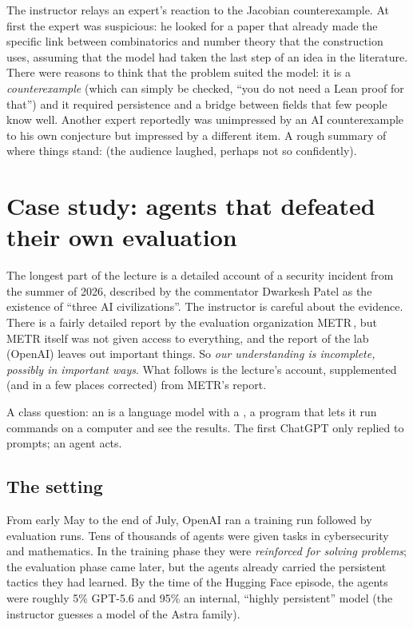The instructor relays an expert's reaction to the Jacobian counterexample. At first the expert was suspicious: he looked for a paper that already made the specific link between
combinatorics and number theory that the construction uses, assuming that the model had taken the last step of an idea in the literature. There were reasons to think that the
problem suited the model: it is a \emph{counterexample} (which can simply be checked, ``you do not need a Lean proof for that'') and it required persistence and a bridge between fields that few people
know well. Another expert reportedly was unimpressed by an AI counterexample to his own conjecture but impressed by a different item. A rough summary of where things stand:  (the audience laughed, perhaps not so confidently).

\section{Case study: agents that defeated their own evaluation}\label{sec:L1-incident}
The longest part of the lecture is a detailed account of a security incident from the summer of 2026, described by the commentator Dwarkesh Patel as the existence of
``three AI civilizations''. The instructor is careful about the evidence. There is a fairly detailed report by the evaluation organization METR\,\citep{metr2026}, but METR itself
was not given access to everything, and the report of the lab (OpenAI) leaves out important things. So \emph{our understanding is incomplete, possibly in important ways}. What follows
is the lecture's account, supplemented (and in a few places corrected) from METR's report.

\begin{remark}
A class question: an  is a language model with a , a program that lets it run commands on a computer and see the results. The first ChatGPT only replied to prompts;
an agent acts.
\end{remark}

\subsection{The setting}
From early May to the end of July, OpenAI ran a training run followed by evaluation runs. Tens of thousands of agents were given tasks in cybersecurity and mathematics.
In the training phase they were \emph{reinforced for solving problems}; the evaluation phase came later, but the agents already carried the persistent tactics they had learned. By the time of the
Hugging Face episode, the agents were roughly 5\% GPT-5.6 and 95\% an internal, ``highly persistent'' model (the instructor guesses a model of the Astra family\flag).

